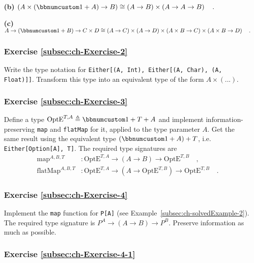 \textbf{(b)} $\left(A\times(\bbnum 1+A)\rightarrow B\right)\cong\left(A\rightarrow B\right)\times\left(A\rightarrow A\rightarrow B\right)\quad.$

\textbf{(c)} $A\rightarrow\left(\bbnum 1+B\right)\rightarrow C\times D\cong\left(A\rightarrow C\right)\times\left(A\rightarrow D\right)\times\left(A\times B\rightarrow C\right)\times\left(A\times B\rightarrow D\right)\quad.$

\subsubsection{Exercise \label{subsec:ch-Exercise-2}\ref{subsec:ch-Exercise-2}}

Write the type notation for \lstinline!Either[(A, Int), Either[(A, Char), (A, Float)]]!.
Transform this type into an equivalent type of the form $A\times(...)$.

\subsubsection{Exercise \label{subsec:ch-Exercise-3}\ref{subsec:ch-Exercise-3}}

Define a type $\text{OptE}^{T,A}\triangleq\bbnum 1+T+A$ and implement
information-preserving \lstinline!map! and \lstinline!flatMap! for
it, applied to the type parameter $A$. Get the same result using
the equivalent type $(\bbnum 1+A)+T$, i.e. \lstinline!Either[Option[A], T]!.
The required type signatures are
\begin{align*}
\text{map}^{A,B,T} & :\text{OptE}^{T,A}\rightarrow\left(A\rightarrow B\right)\rightarrow\text{OptE}^{T,B}\quad,\\
\text{flatMap}^{A,B,T} & :\text{OptE}^{T,A}\rightarrow(A\rightarrow\text{OptE}^{T,B})\rightarrow\text{OptE}^{T,B}\quad.
\end{align*}


\subsubsection{Exercise \label{subsec:ch-Exercise-4}\ref{subsec:ch-Exercise-4}}

Implement the \lstinline!map! function for \lstinline!P[A]! (see
Example~\ref{subsec:ch-solvedExample-2}). The required type signature
is $P^{A}\rightarrow\left(A\rightarrow B\right)\rightarrow P^{B}$.
Preserve information as much as possible.

\subsubsection{Exercise \label{subsec:ch-Exercise-4-1}\ref{subsec:ch-Exercise-4-1}}

